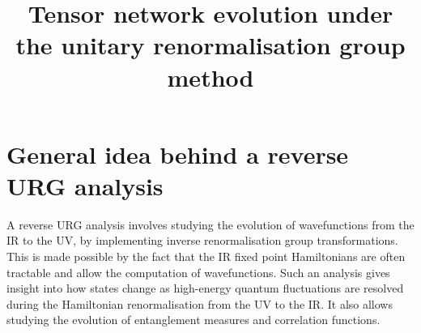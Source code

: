 \documentclass[prb]{revtex4-2}
\begin{document}
\title{Tensor network evolution under the unitary renormalisation group method}

\maketitle

\section{General idea behind a reverse URG analysis}
A reverse URG analysis involves studying the evolution of wavefunctions from the IR to the UV, by implementing inverse renormalisation group transformations. This is made possible by the fact that the IR fixed point Hamiltonians are often tractable and allow the computation of wavefunctions. Such an analysis gives insight into how states change as high-energy quantum fluctuations are resolved during the Hamiltonian renormalisation from the UV to the IR. It also allows studying the evolution of entanglement measures and correlation functions.
\end{document}
